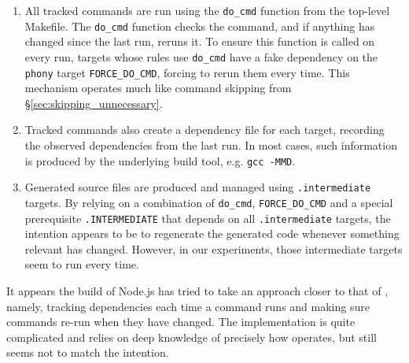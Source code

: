 \begin{enumerate}
\item All tracked commands are run using the \texttt{do\_cmd} function from the top-level Makefile. The \texttt{do\_cmd} function checks the command, and if anything has changed since the last run, reruns it. To ensure this function is called on every run, targets whose rules use \texttt{do\_cmd} have a fake dependency on the \texttt{phony} target \texttt{FORCE\_DO\_CMD}, forcing \Make to rerun them every time. This mechanism operates much like \Rattle command skipping from \S\ref{sec:skipping_unnecessary}.
\item Tracked commands also create a dependency file for each target, recording the observed dependencies from the last run. In most cases, such information is produced by the underlying build tool, e.g. \texttt{gcc -MMD}.
\item Generated source files are produced and managed using \texttt{.intermediate} targets. By relying on a combination of \texttt{do\_cmd}, \texttt{FORCE\_DO\_CMD} and a special prerequisite \texttt{.INTERMEDIATE} that depends on all \texttt{.intermediate} targets, the intention appears to be to regenerate the generated code whenever something relevant has changed. However, in our experiments, those intermediate targets seem to run every time.
\end{enumerate}

It appears the build of Node.js has tried to take an approach closer to that of \Rattle, namely, tracking dependencies each time a command runs and making sure commands re-run when they have changed.  The implementation is quite complicated and relies on deep knowledge of precisely how \Make operates, but still seems not to match the intention.


